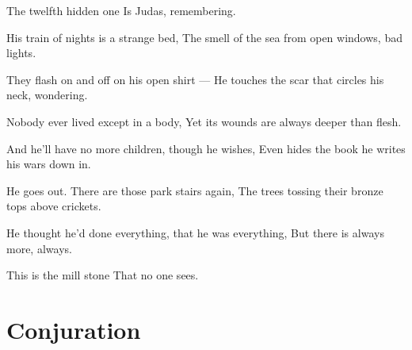 \documentclass[english,11pt,letterpaper,onecolumn,parskip=full]{scrbook}
\begin{document}
\begin{poem}
\begin{stanza}
The twelfth hidden one \verseline
Is Judas, remembering.
\end{stanza}

\begin{stanza}
His train of nights is a strange bed, \verseline
The smell of the sea from open windows, bad lights.
\end{stanza}

\begin{stanza}
They flash on and off on his open shirt ---  \verseline
He touches the scar that circles his neck, wondering.
\end{stanza}

\begin{stanza}
Nobody ever lived except in a body, \verseline
Yet its wounds are always deeper than flesh.
\end{stanza}

\begin{stanza}
And he'll have no more children, though he wishes, \verseline
Even hides the book he writes his wars down in.
\end{stanza}

\begin{stanza}
He goes out.  There are those park stairs again, \verseline
The trees tossing their bronze tops above crickets.
\end{stanza}

\begin{stanza}
He thought he'd done everything, that he was everything, \verseline
But there is always more, always.  
\end{stanza}

\begin{stanza}
This is the mill stone \verseline
That no one sees.
\end{stanza}
\end{poem}

\newpage
\section{Conjuration}
\end{document}
